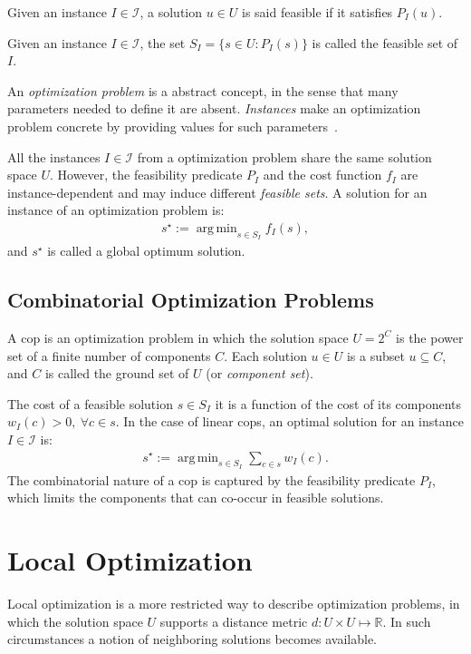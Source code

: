\documentclass[12pt]{llncs}
\DeclareMathOperator*{\argmin}{arg\,min}
\begin{document}
\begin{definition}
Given an instance $I\in\mathcal{I}$, a solution $u\in U$ is said feasible if it satisfies $P_I(u)$.
\end{definition}

\begin{definition}
Given an instance $I\in\mathcal{I}$, the set $S_I = \{s\in U : P_I(s)\}$ is called the feasible set of $I$.
\end{definition}

An \textit{optimization problem} is a abstract concept, in the sense that many parameters needed to define it are absent.  \textit{Instances} make an optimization problem concrete by providing values for such parameters~\citep{stutzle1999local}. 

All the instances $I\in\mathcal{I}$ from a optimization problem share the same solution space $U$. However, the feasibility predicate $P_I$ and the cost function $f_I$ are instance-dependent and may induce different \textit{feasible sets}. A solution for an instance of an optimization problem is:
\begin{align}
s^\star := \argmin_{s\in S_I} {f_I(s)},
\end{align}
and $s^\star$ is called a global optimum solution.


\subsection{Combinatorial Optimization Problems~\small\citep{michiels2010}}
A \gls{cop} is an optimization problem in which the solution space $U= 2^C$ is the power set of a finite number of components $C$. Each solution $u\in U$ is a subset $u\subseteq C$, and $C$ is called the ground set of $U$ (or \textit{component set}). 

The cost of a feasible solution $s\in S_I$ it is a function of the cost of its components $w_I(c)> 0,~\forall c\in s$. In the case of linear \glspl{cop}, an optimal solution for an instance $I\in\mathcal{I}$ is:
\begin{align}
s^\star := \argmin_{s\in S_I} {\sum_{c\in s} w_I(c)}.
\end{align}
The combinatorial nature of a \gls{cop} is captured by the feasibility predicate $P_I$, which limits the components that can co-occur in feasible solutions.


\section{Local Optimization}
Local optimization is a more restricted way to describe optimization problems, in which the solution space $U$ supports a distance metric $d : U\times U \mapsto \mathbb{R}$. In such circumstances a notion of neighboring solutions becomes available.
\end{document}
